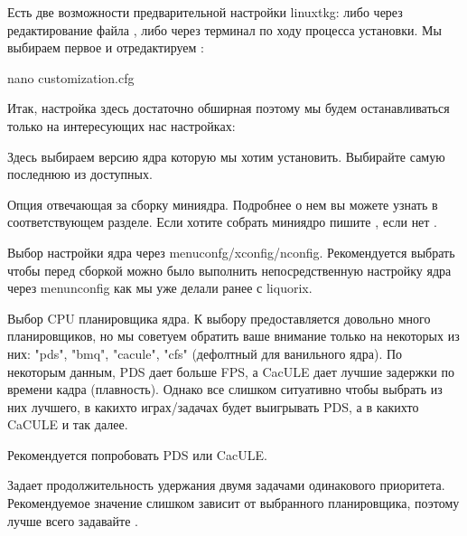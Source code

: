 \documentclass[letterpaper,10pt,russian,openany]{sphinxmanual}
\begin{document}
\sphinxAtStartPar
Есть две возможности предварительной настройки linux\sphinxhyphen{}tkg: либо через редактирование файла ,
либо через терминал по ходу процесса установки.
Мы выбираем первое и отредактируем :

\begin{sphinxVerbatim}[commandchars=\\\{\}]
nano customization.cfg
\end{sphinxVerbatim}

\sphinxAtStartPar
Итак, настройка здесь достаточно обширная поэтому мы будем останавливаться только на интересующих нас настройках:

\sphinxAtStartPar
{} \sphinxhyphen{} Здесь выбираем версию ядра которую мы хотим установить.
Выбирайте самую последнюю из доступных.

\sphinxAtStartPar
{} \sphinxhyphen{} Опция отвечающая за сборку мини\sphinxhyphen{}ядра.
Подробнее о нем вы можете узнать в соответствующем разделе.
Если хотите собрать мини\sphinxhyphen{}ядро \sphinxhyphen{} пишите , если нет \sphinxhyphen{} .

\sphinxAtStartPar
{} \sphinxhyphen{} Выбор настройки ядра через menuconfg/xconfig/nconfig.
Рекомендуется выбрать  чтобы перед сборкой можно было выполнить непосредственную настройку ядра через menunconfig как мы уже делали ранее с liquorix.

\sphinxAtStartPar
{} \sphinxhyphen{} Выбор CPU планировщика ядра.
К выбору предоставляется довольно много планировщиков, но мы советуем обратить ваше внимание только на некоторых из них:
"pds",  "bmq", "cacule", "cfs" (дефолтный для ванильного ядра).
По некоторым данным, PDS дает больше FPS, а CacULE дает лучшие задержки по времени кадра (плавность).
Однако все слишком ситуативно чтобы выбрать из них лучшего, в каких\sphinxhyphen{}то играх/задачах будет выигрывать PDS, а в каких\sphinxhyphen{}то CaCULE и так далее.

\sphinxAtStartPar
Рекомендуется попробовать PDS или CacULE.

\sphinxAtStartPar
{} \sphinxhyphen{} Задает продолжительность удержания двумя задачами одинакового приоритета.
Рекомендуемое значение слишком зависит от выбранного планировщика, поэтому лучше всего задавайте .
\end{document}
